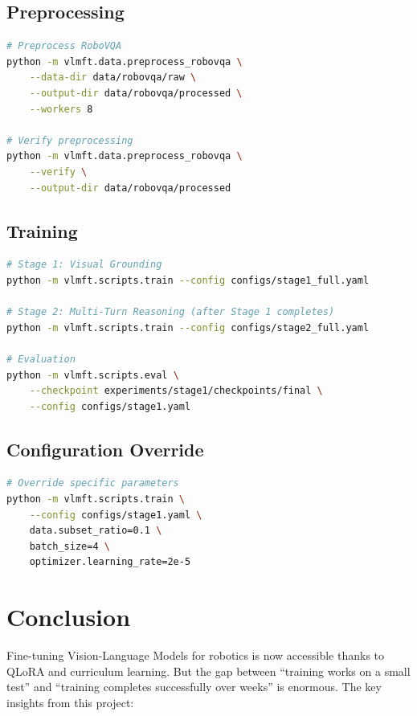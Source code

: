 \documentclass[11pt,a4paper]{article}
\begin{document}
\subsection{Preprocessing}

\begin{lstlisting}[language=bash,caption=Preprocessing commands]
# Preprocess RoboVQA
python -m vlmft.data.preprocess_robovqa \
    --data-dir data/robovqa/raw \
    --output-dir data/robovqa/processed \
    --workers 8

# Verify preprocessing
python -m vlmft.data.preprocess_robovqa \
    --verify \
    --output-dir data/robovqa/processed
\end{lstlisting}

\subsection{Training}

\begin{lstlisting}[language=bash,caption=Training commands]
# Stage 1: Visual Grounding
python -m vlmft.scripts.train --config configs/stage1_full.yaml

# Stage 2: Multi-Turn Reasoning (after Stage 1 completes)
python -m vlmft.scripts.train --config configs/stage2_full.yaml

# Evaluation
python -m vlmft.scripts.eval \
    --checkpoint experiments/stage1/checkpoints/final \
    --config configs/stage1.yaml
\end{lstlisting}

\subsection{Configuration Override}

\begin{lstlisting}[language=bash,caption=Configuration override example]
# Override specific parameters
python -m vlmft.scripts.train \
    --config configs/stage1.yaml \
    data.subset_ratio=0.1 \
    batch_size=4 \
    optimizer.learning_rate=2e-5
\end{lstlisting}

\section{Conclusion}

Fine-tuning Vision-Language Models for robotics is now accessible thanks to QLoRA and curriculum learning. But the gap between ``training works on a small test'' and ``training completes successfully over weeks'' is enormous. The key insights from this project:
\end{document}
